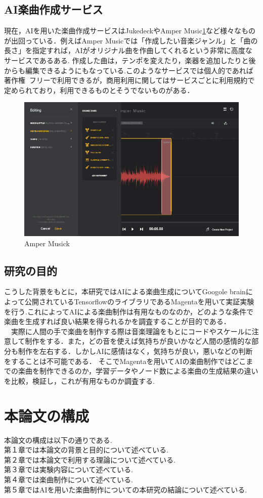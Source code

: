 \subsection{AI楽曲作成サービス}
現在，AIを用いた楽曲作成サービスはJukedeck\cite{webpage10}やAmper Music\ref{fig:Amper Music}\cite{webpage11}など様々なものが出回っている．例えばAmper Musicでは「作成したい音楽ジャンル」と「曲の長さ」を指定すれば，AIがオリジナル曲を作曲してくれるという非常に高度なサービスであるある. 
作成した曲は，テンポを変えたり，楽器を追加したりと後からも編集できるようにもなっている.このようなサービスでは個人的であれば著作権フリーで利用できるが，商用利用に関してはサービスごとに利用規約で定められており，利用できるものとそうでないものがある．\\
\begin{figure}[!ht]
    \begin{screen}
    \begin{center}
        \includegraphics[scale=1, clip]{./img/Amper1.jpg}
        \caption{Amper Musick}
        \label{fig:Amper Music}
    \end{center}
\end{screen}
\end{figure}
\newpage
\subsection{研究の目的}
こうした背景をもとに，本研究ではAIによる楽曲生成についてGoogole brainによって公開されているTensorflowのライブラリであるMagentaを用いて実証実験を行う.これによってAIによる楽曲制作は有用なものなのか，どのような条件で楽曲を生成すれば良い結果を得られるかを調査することが目的である．\\
　実際に人間の手で楽曲を制作する際は音楽理論をもとにコードやスケールに注意して制作をする．また，どの音を使えば気持ちが良いかなど人間の感情的な部分も制作を左右する．しかしAIに感情はなく，気持ちが良い，悪いなどの判断をすることは不可能である．
そこでMagentaを用いてAIの楽曲制作ではどこまでの楽曲を制作できるのか，学習データやノード数による楽曲の生成結果の違いを比較，検証し，これが有用なものか調査する.\\
\newpage
\section{本論文の構成}
本論文の構成は以下の通りである.\\
第１章では本論文の背景と目的について述べている.\\
第２章では本論文で利用する理論について述べている.\\
第３章では実験内容について述べている.\\
第４章では楽曲制作について述べている.\\
第５章ではAIを用いた楽曲制作についての本研究の結論について述べている.\\